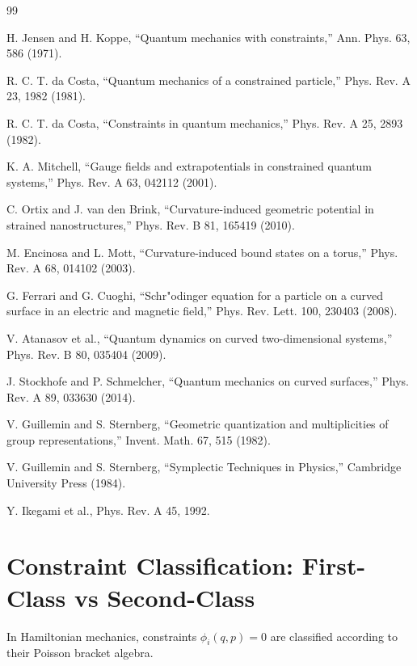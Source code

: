 \documentclass[11pt]{article}
\begin{document}
\begin{thebibliography}{99}

H. Jensen and H. Koppe,
``Quantum mechanics with constraints,''
Ann. Phys. 63, 586 (1971).

R. C. T. da Costa,
``Quantum mechanics of a constrained particle,''
Phys. Rev. A 23, 1982 (1981).

R. C. T. da Costa,
``Constraints in quantum mechanics,''
Phys. Rev. A 25, 2893 (1982).

K. A. Mitchell,
``Gauge fields and extrapotentials in constrained quantum systems,''
Phys. Rev. A 63, 042112 (2001).

C. Ortix and J. van den Brink,
``Curvature-induced geometric potential in strained nanostructures,''
Phys. Rev. B 81, 165419 (2010).

M. Encinosa and L. Mott,
``Curvature-induced bound states on a torus,''
Phys. Rev. A 68, 014102 (2003).

G. Ferrari and G. Cuoghi,
``Schr"odinger equation for a particle on a curved surface in an electric and magnetic field,''
Phys. Rev. Lett. 100, 230403 (2008).

V. Atanasov et al.,
``Quantum dynamics on curved two-dimensional systems,''
Phys. Rev. B 80, 035404 (2009).

J. Stockhofe and P. Schmelcher,
``Quantum mechanics on curved surfaces,''
Phys. Rev. A 89, 033630 (2014).

V. Guillemin and S. Sternberg,
``Geometric quantization and multiplicities of group representations,''
Invent. Math. 67, 515 (1982).

V. Guillemin and S. Sternberg,
``Symplectic Techniques in Physics,''
Cambridge University Press (1984).

Y. Ikegami et al.,
Phys. Rev. A 45, 1992.

\end{thebibliography}

\appendix

\section{Constraint Classification: First-Class vs Second-Class}

In Hamiltonian mechanics, constraints $\phi_i(q,p)=0$ are classified according to their Poisson bracket algebra.
\end{document}
